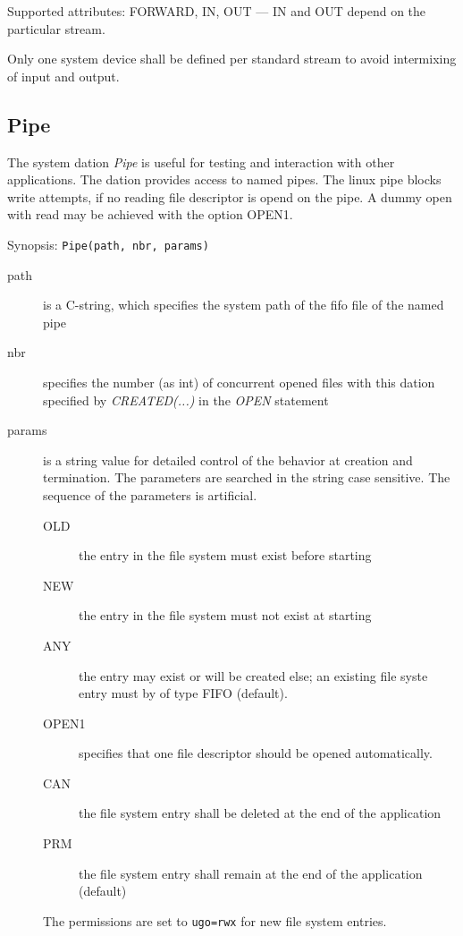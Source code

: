 Supported attributes: FORWARD, IN, OUT --- IN and OUT depend on the
particular stream.

Only one system device shall be defined per standard stream to avoid
intermixing of input and output.

\subsection{Pipe}
The system dation {\em Pipe} is useful for testing and interaction with
other applications. The dation provides access to named pipes.
The linux pipe blocks write attempts, if no reading file descriptor
is opend on the pipe. 
A dummy open with read may be achieved with the option OPEN1.

Synopsis: \verb|Pipe(path, nbr, params)|

\begin{description}
\item [path] is a C-string, which specifies the system path of the fifo file
    of the named pipe
\item[nbr] specifies the number (as int) of concurrent opened files with this dation
     specified by {\em CREATED(...)} in the {\em OPEN} statement
\item [params] is a string value for detailed control of the behavior
     at creation and termination. The parameters are searched in the string
     case sensitive. The sequence of the parameters is artificial.
   \begin{description}
     \item[OLD] the entry in the file system must exist before starting
     \item[NEW] the entry in the file system must not exist at starting
     \item[ANY] the entry may exist or will be created else; an existing
                file syste entry must by of type FIFO (default).
     \item[OPEN1] specifies that one file descriptor should be opened 
                automatically.
     \item[CAN] the file system entry shall be deleted at the end of the 
                application
     \item[PRM] the file system entry shall remain at the end of the
                application (default)
   \end{description} 
   The permissions are set to \verb|ugo=rwx| for new file system entries.
\end{description}

